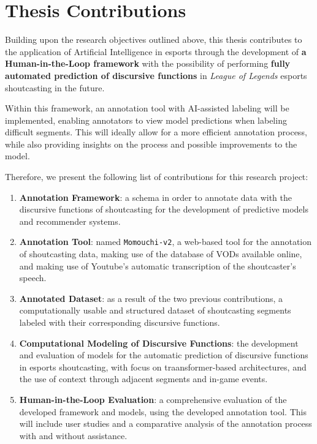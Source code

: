 \section{Thesis Contributions}
\label{sec:}

Building upon the research objectives outlined above, this thesis contributes to the application of Artificial Intelligence in esports through the development of \textbf{a Human-in-the-Loop framework} with the possibility of performing \textbf{fully automated prediction of discursive functions} in \textit{League of Legends} esports shoutcasting in the future.

\medskip

Within this framework, an annotation tool with AI-assisted labeling will be implemented, enabling annotators to view model predictions when labeling difficult segments. This will ideally allow for a more efficient annotation process, while also providing insights on the process and possible improvements to the model.

\medskip

Therefore, we present the following list of contributions for this research project:
\begin{enumerate}
  \item \textbf{Annotation Framework}: a schema in order to annotate data with the discursive functions of shoutcasting for the development of predictive models and recommender systems.
  \item \textbf{Annotation Tool}: named \texttt{Momouchi-v2}, a web-based tool for the annotation of shoutcasting data, making use of the database of VODs available online, and making use of Youtube's automatic transcription of the shoutcaster's speech.
  \item \textbf{Annotated Dataset}: as a result of the two previous contributions, a computationally usable and structured dataset of shoutcasting segments labeled with their corresponding discursive functions.
  \item \textbf{Computational Modeling of Discursive Functions}: the development and evaluation of models for the automatic prediction of discursive functions in esports shoutcasting, with focus on traansformer-based architectures, and the use of context through adjacent segments and in-game events.
  \item \textbf{Human-in-the-Loop Evaluation}: a comprehensive evaluation of the developed framework and models, using the developed annotation tool. This will include user studies and a comparative analysis of the annotation process with and without assistance. 
\end{enumerate}


